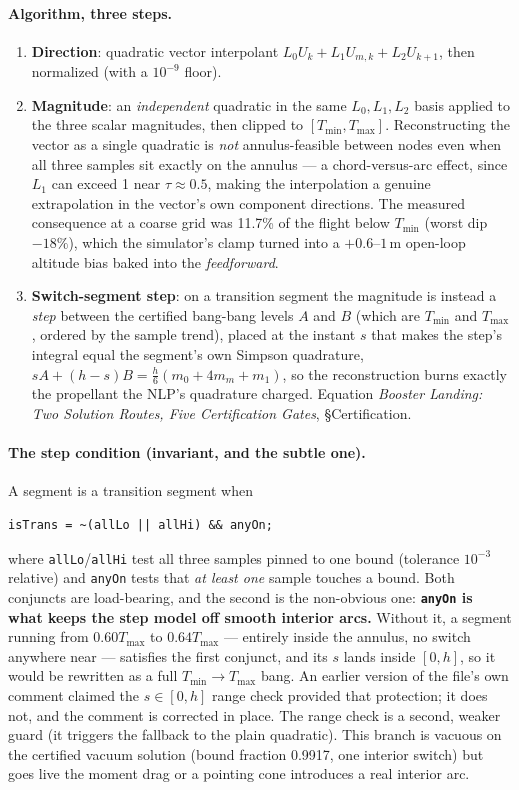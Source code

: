\documentclass[11pt]{article}
\newcommand{\thenote}{\emph{Booster Landing: Two Solution Routes, Five
Certification Gates}}
\newcommand{\noteS}[1]{\thenote, \S#1}
\newcommand{\Tmin}{T_{\min}}
\newcommand{\Tmax}{T_{\max}}
\begin{document}
\paragraph{Algorithm, three steps.}
\begin{enumerate}
\item \textbf{Direction}: quadratic vector interpolant
$L_0U_k + L_1U_{m,k} + L_2U_{k+1}$, then normalized (with a $10^{-9}$
floor).
\item \textbf{Magnitude}: an \emph{independent} quadratic in the same
$L_0,L_1,L_2$ basis applied to the three scalar magnitudes, then clipped to
$[\Tmin,\Tmax]$. Reconstructing the vector as a single quadratic is
\emph{not} annulus-feasible between nodes even when all three samples sit
exactly on the annulus --- a chord-versus-arc effect, since $L_1$ can exceed
1 near $\tau\approx0.5$, making the interpolation a genuine extrapolation in
the vector's own component directions. The measured consequence at a coarse
grid was 11.7\% of the flight below $\Tmin$ (worst dip $-18\%$), which the
simulator's clamp turned into a $+0.6$--$1$\,m open-loop altitude bias baked
into the \emph{feedforward}.
\item \textbf{Switch-segment step}: on a transition segment the magnitude is
instead a \emph{step} between the certified bang-bang levels $A$ and $B$
(which are $\Tmin$ and $\Tmax$, ordered by the sample trend), placed at the
instant $s$ that makes the step's integral equal the segment's own Simpson
quadrature, $sA + (h-s)B = \tfrac{h}{6}(m_0 + 4m_m + m_1)$, so the
reconstruction burns exactly the propellant the NLP's quadrature charged.
Equation \noteS{Certification}.
\end{enumerate}

\paragraph{The step condition (invariant, and the subtle one).} A segment is
a transition segment when
\begin{verbatim}
isTrans = ~(allLo || allHi) && anyOn;
\end{verbatim}
where \texttt{allLo}/\texttt{allHi} test all three samples pinned to one
bound (tolerance $10^{-3}$ relative) and \texttt{anyOn} tests that
\emph{at least one} sample touches a bound. Both conjuncts are load-bearing,
and the second is the non-obvious one: \textbf{\texttt{anyOn} is what keeps
the step model off smooth interior arcs.} Without it, a segment running from
$0.60\Tmax$ to $0.64\Tmax$ --- entirely inside the annulus, no switch
anywhere near --- satisfies the first conjunct, and its $s$ lands inside
$[0,h]$, so it would be rewritten as a full $\Tmin\!\to\!\Tmax$ bang. An
earlier version of the file's own comment claimed the $s\in[0,h]$ range
check provided that protection; it does not, and the comment is corrected in
place. The range check is a second, weaker guard (it triggers the fallback
to the plain quadratic). This branch is vacuous on the certified vacuum
solution (bound fraction 0.9917, one interior switch) but goes live the
moment drag or a pointing cone introduces a real interior arc.
\end{document}
